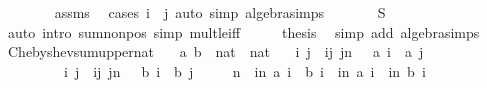 \begin{isabellebody}
\ \ \ \ \ \ \isamarkupfalse%
\ assms\ \isamarkupfalse%
\ {\isacharparenleft}{\kern0pt}cases\ {\isachardoublequoteopen}i\ {\isasymle}\ j{\isachardoublequoteclose}{\isacharparenright}{\kern0pt}\ {\isacharparenleft}{\kern0pt}auto\ simp{\isacharcolon}{\kern0pt}\ algebra{\isacharunderscore}{\kern0pt}simps{\isacharparenright}{\kern0pt}\isanewline
\ \ \isacommand{{\isacharbraceright}{\kern0pt}}\isamarkupfalse%
\ \isamarkupfalse%
\ \isamarkupfalse%
\ {\isachardoublequoteopen}{\isacharquery}{\kern0pt}S\ {\isasymle}\ {}{\isachardoublequoteclose}\isanewline
\ \ \ \ \isamarkupfalse%
\ {\isacharparenleft}{\kern0pt}auto\ intro{\isacharbang}{\kern0pt}{\isacharcolon}{\kern0pt}\ sum{\isacharunderscore}{\kern0pt}nonpos\ simp{\isacharcolon}{\kern0pt}\ mult{\isacharunderscore}{\kern0pt}le{\isacharunderscore}{\kern0pt}{}{\isacharunderscore}{\kern0pt}iff{\isacharparenright}{\kern0pt}\isanewline
\ \ \isamarkupfalse%
\ \isamarkupfalse%
\ {\isacharquery}{\kern0pt}thesis\ \isamarkupfalse%
\ {\isacharparenleft}{\kern0pt}simp\ add{\isacharcolon}{\kern0pt}\ algebra{\isacharunderscore}{\kern0pt}simps{\isacharparenright}{\kern0pt}\isanewline
{}\isamarkupfalse%
%
\endisatagproof
{\isafoldproof}%
%
\isadelimproof
\isanewline
%
\endisadelimproof
\isanewline
{}\isamarkupfalse%
\ Chebyshev{\isacharunderscore}{\kern0pt}sum{\isacharunderscore}{\kern0pt}upper{\isacharunderscore}{\kern0pt}nat{\isacharcolon}{\kern0pt}\isanewline
\ \ \ a\ b\ {\isacharcolon}{\kern0pt}{\isacharcolon}{\kern0pt}\ {\isachardoublequoteopen}nat\ {\isasymRightarrow}\ nat{\isachardoublequoteclose}\isanewline
\ \ \ {\isachardoublequoteopen}{\isacharparenleft}{\kern0pt}{\isasymAnd}i\ j{\isachardot}{\kern0pt}\ {\isasymlbrakk}\ i{\isasymle}j{\isacharsemicolon}{\kern0pt}\ j{\isacharless}{\kern0pt}n\ {\isasymrbrakk}\ {\isasymLongrightarrow}\ a\ i\ {\isasymle}\ a\ j{\isacharparenright}{\kern0pt}\ {\isasymLongrightarrow}\isanewline
\ \ \ \ \ \ \ \ \ {\isacharparenleft}{\kern0pt}{\isasymAnd}i\ j{\isachardot}{\kern0pt}\ {\isasymlbrakk}\ i{\isasymle}j{\isacharsemicolon}{\kern0pt}\ j{\isacharless}{\kern0pt}n\ {\isasymrbrakk}\ {\isasymLongrightarrow}\ b\ i\ {\isasymge}\ b\ j{\isacharparenright}{\kern0pt}\ {\isasymLongrightarrow}\isanewline
\ \ \ \ n\ {\isacharasterisk}{\kern0pt}\ {\isacharparenleft}{\kern0pt}{\isasymSum}i{\isacharequal}{\kern0pt}{}{\isachardot}{\kern0pt}{\isachardot}{\kern0pt}{\isacharless}{\kern0pt}n{\isachardot}{\kern0pt}\ a\ i\ {\isacharasterisk}{\kern0pt}\ b\ i{\isacharparenright}{\kern0pt}\ {\isasymle}\ {\isacharparenleft}{\kern0pt}{\isasymSum}i{\isacharequal}{\kern0pt}{}{\isachardot}{\kern0pt}{\isachardot}{\kern0pt}{\isacharless}{\kern0pt}n{\isachardot}{\kern0pt}\ a\ i{\isacharparenright}{\kern0pt}\ {\isacharasterisk}{\kern0pt}\ {\isacharparenleft}{\kern0pt}{\isasymSum}i{\isacharequal}{\kern0pt}{}{\isachardot}{\kern0pt}{\isachardot}{\kern0pt}{\isacharless}{\kern0pt}n{\isachardot}{\kern0pt}\ b\ i{\isacharparenright}{\kern0pt}{\isachardoublequoteclose}\isanewline

\end{isabellebody}
